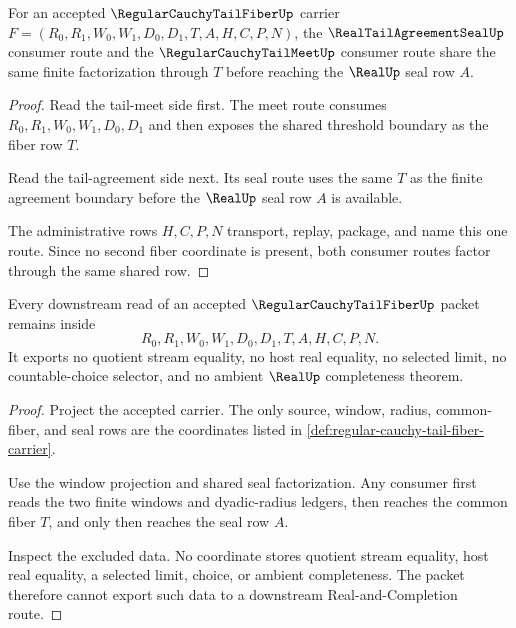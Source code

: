 \begin{theorem}
\label{thm:regular-cauchy-tail-fiber-shared-seal-factorization}
For an accepted $\RegularCauchyTailFiberUp$ carrier $F=(R_0,R_1,W_0,W_1,D_0,D_1,T,A,H,C,P,N)$, the $\RealTailAgreementSealUp$ consumer route and the $\RegularCauchyTailMeetUp$ consumer route share the same finite factorization through $T$ before reaching the $\RealUp$ seal row $A$.
\end{theorem}
\begin{proof}
Read the tail-meet side first. The meet route consumes $R_0,R_1,W_0,W_1,D_0,D_1$ and then exposes the shared threshold boundary as the fiber row $T$.

Read the tail-agreement side next. Its seal route uses the same $T$ as the finite agreement boundary before the $\RealUp$ seal row $A$ is available.

The administrative rows $H,C,P,N$ transport, replay, package, and name this one route. Since no second fiber coordinate is present, both consumer routes factor through the same shared row.
\end{proof}

\begin{theorem}
\label{thm:regular-cauchy-tail-fiber-nonescape}
Every downstream read of an accepted $\RegularCauchyTailFiberUp$ packet remains inside
$$
R_0,R_1,W_0,W_1,D_0,D_1,T,A,H,C,P,N.
$$
It exports no quotient stream equality, no host real equality, no selected limit, no countable-choice selector, and no ambient $\RealUp$ completeness theorem.
\end{theorem}
\begin{proof}
Project the accepted carrier. The only source, window, radius, common-fiber, and seal rows are the coordinates listed in \autoref{def:regular-cauchy-tail-fiber-carrier}.

Use the window projection and shared seal factorization. Any consumer first reads the two finite windows and dyadic-radius ledgers, then reaches the common fiber $T$, and only then reaches the seal row $A$.

Inspect the excluded data. No coordinate stores quotient stream equality, host real equality, a selected limit, choice, or ambient completeness. The packet therefore cannot export such data to a downstream Real-and-Completion route.
\end{proof}

